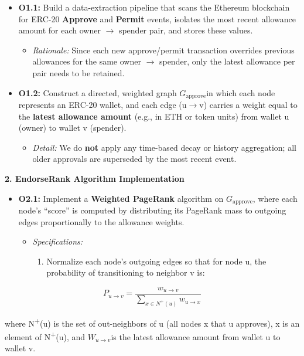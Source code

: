 \documentclass[12pt]{article}
\newcommand{\proposalSubheading}[1]{%
  \par\addvspace{0.38\baselineskip}%
  \noindent\textbf{#1}\par\nobreak\addvspace{0.08\baselineskip}%
}
\begin{document}
\begin{itemize}
\item[\textbullet] \textbf{O1.1: }Build a data-extraction pipeline that scans the Ethereum blockchain for ERC-20 \textbf{Approve }and \textbf{Permit }events, isolates the most recent allowance amount for each owner \(\to\) spender pair, and stores these values.
\begin{itemize}
\item[\textendash] \emph{Rationale: }Since each new approve/permit transaction overrides previous allowances for the same owner \(\to\) spender, only the latest allowance per pair needs to be retained.
\end{itemize}
\item[\textbullet] \textbf{O1.2: }Construct a directed, weighted graph $G_{\text{approve}}$in which each node represents an ERC-20 wallet, and each edge (u\(\to\)v) carries a weight equal to the \textbf{latest allowance amount }(e.g., in ETH or token units) from wallet u (owner) to wallet v (spender).
\begin{itemize}
\item[\textendash] \emph{Detail: }We do \textbf{not }apply any time-based decay or history aggregation; all older approvals are superseded by the most recent event.
\end{itemize}
\end{itemize}
\proposalSubheading{2. EndorseRank Algorithm Implementation}

\begin{itemize}
\item[\textbullet] \textbf{O2.1: }Implement a \textbf{Weighted PageRank }algorithm on $G_{\text{approve}}$, where each node's ``score'' is computed by distributing its PageRank mass to outgoing edges proportionally to the allowance weights.
\begin{itemize}
\item[\textendash] \emph{Specifications:}
\begin{enumerate}
\item[(a)] Normalize each node's outgoing edges so that for node u, the probability of transitioning to neighbor v is:
\end{enumerate}
\end{itemize}
\end{itemize}
\[P_{u\to v} = \frac{w_{u\to v}}{\sum _{x\in N^{+}(u)}w_{u\to x}}\]

where N\textsuperscript{+}(u) is the set of out-neighbors of u (all nodes x that u approves), x is an element of N\textsuperscript{+}(u), and $W_{u\to v}$is the latest allowance amount from wallet u to wallet v.
\end{document}
